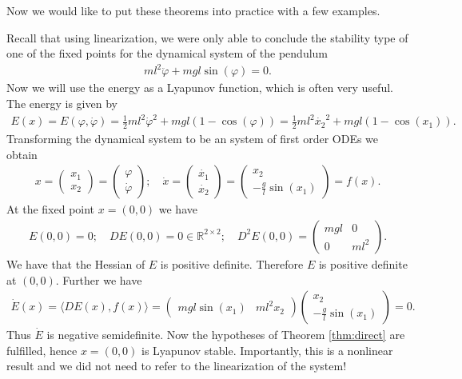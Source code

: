 Now we would like to put these theorems into practice with a few examples.
\begin{ex}
	Recall that using linearization, we were only able to conclude the stability type of one of the fixed points for the dynamical system of the pendulum
	\begin{align}
		ml^2 \ddot{\varphi} + mgl \sin(\varphi) =0.
	\end{align}
Now we will use the energy as a Lyapunov function, which is often very useful. The energy is given by
\begin{align}
	E(x) = E(\varphi, \dot{\varphi}) = \frac{1}{2}ml^2 \dot{\varphi}^2 + mgl(1-\cos(\varphi)) 
	= \frac{1}{2}ml^2 \dot{x_2}^2 + mgl(1-\cos(x_1)).
\end{align}
Transforming the dynamical system to be an system of first order ODEs we obtain
\begin{align}
	x = 
	\begin{pmatrix}
		x_1 \\x_2
	\end{pmatrix}
	=
	\begin{pmatrix}
		\varphi \\ \dot{\varphi}
	\end{pmatrix}
	;\quad \dot{x}=
	\begin{pmatrix}
		\dot{x_1} \\ \dot{x_2}
	\end{pmatrix}
	=
	\begin{pmatrix}
		x_2 \\ - \frac{g}{l} \sin (x_1)
	\end{pmatrix}
	=f(x).
\end{align}
At the fixed point $x=(0,0)$ we have
\begin{align}
	E(0,0) = 0;\quad DE(0,0) = 0\in \mathbb{R}^{2\times 2};\quad D^2E(0,0) =
\begin{pmatrix}
	mgl & 0 \\
	0 & ml^2
\end{pmatrix}.
\end{align}
We have that the Hessian of $E$ is positive definite. Therefore $E$ is positive definite at $(0,0)$. Further we have
\begin{align}
	\dot{E}(x) = \langle DE(x), f(x) \rangle 
	=
	\begin{pmatrix}
		mgl \sin(x_1) &  ml^2 x_2
	\end{pmatrix}
	\begin{pmatrix}
		x_2 \\ - \frac{g}{l}\sin (x_1)			
	\end{pmatrix}
	= 0.	
\end{align}
Thus $\dot{E}$ is negative semidefinite. Now the hypotheses of Theorem \ref{thm:direct} are fulfilled, hence $x=(0,0)$ is Lyapunov stable. Importantly, this is a nonlinear result and we did not need to refer to the linearization of the system!


\end{ex}
